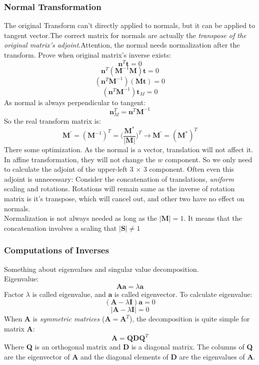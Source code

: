 \documentclass[10pt, a4paper]{article}
\begin{document}
            \subsubsection{Normal Transformation}
                The original Transform can't directly applied to normals, but it can be applied to tangent vector.The correct matrix for normals are actually the \emph{transpose of the original matrix's adjoint}.Attention, the normal needs normalization after the transform.\newline
                \indent Prove when original matrix's inverse exists:\newline
                $$\textbf{n}^T\textbf{t} = 0$$
                $$\textbf{n}^T(\textbf{M}^{-1}\textbf{M})\textbf{t} = 0$$
                $$(\textbf{n}^T\textbf{M}^{-1})(\textbf{M}\textbf{t}) = 0$$
                $$(\textbf{n}^T\textbf{M}^{-1})\textbf{t}_M = 0$$
                \indent As normal is always perpendicular to tangent:\newline
                $$\textbf{n}_M^T = \textbf{n}^T\textbf{M}^{-1}$$
                \indent So the real transform matrix is:\newline
                $$\textbf{M}^{'} = (\textbf{M}^{-1})^T=({\frac{\textbf{M}^{*}}{|\textbf{M}|})^T} \to \textbf{M}^{'} = ({\textbf{M}^{*}})^T$$
                \indent There some optimization. As the normal is a vector, translation will not affect it. In affine transformation, they will not change the $w$ component. So we only need to calculate the adjoint of the upper-left 3 $\times$ 3 component. Often even this adjoint is unnecessary: Consider the concatenation of translations, \emph{uniform} scaling and rotations. Rotations will remain same as the inverse of rotation matrix is it's transpose, which will cancel out,  and other two have no effect on normals.\\ 
                \indent Normalization is not always needed as long as the $|\textbf{M}| = 1$. It means that the concatenation involves a scaling that $|\textbf{S}| \ne 1$\newpage 
            
            \subsubsection {Computations of Inverses}
                Something about  eigenvalues and singular value decomposition.\\
                Eigenvalue:
                $$\textbf{A}\textbf{a} = \lambda\textbf{a}$$
                \indent Factor $\lambda$ is called eigenvalue, and $\textbf{a}$ is called eigenvector. To calculate eigenvalue:
                $$(\textbf{A} - \lambda\textbf{I})\textbf{a} = 0$$
                $$|\textbf{A} - \lambda\textbf{I}| = 0$$
                \indent When \textbf{A} is \emph{symmetric matrices} ($\textbf{A} = \textbf{A}^T$), the decomposition is quite simple for matrix \textbf{A}: 
                $$\textbf{A} = \textbf{QD}\textbf{Q}^T$$
                Where \textbf{Q} is an orthogonal matrix and \textbf{D} is a diagonal matrix. The columns of \textbf{Q} are the eigenvector of \textbf{A} and the diagonal elements of \textbf{D} are the eigenvalues of \textbf{A}.\\
                
\end{document}

